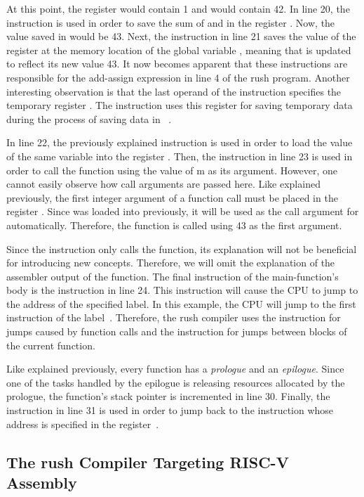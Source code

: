 At this point, the register  would contain 1 and  would contain 42.
In line 20, the  instruction is used in order to save the sum of  and  in the register .
Now, the value saved in  would be 43.
Next, the  instruction in line 21 saves the value of the register  at the memory location of the global variable , meaning that  is updated to reflect its new value 43.
It now becomes apparent that these instructions are responsible for the add-assign expression in line 4 of the rush program.
Another interesting observation is that the last operand of the  instruction specifies the temporary register .
The instruction uses this register for saving temporary data during the process of saving data in ~\cite[reference]{Patterson2017}.

In line 22, the previously explained  instruction is used in order to load the value of the same variable into the register .
Then, the  instruction in line 23 is used in order to call the  function using the value of m as its argument.
However, one cannot easily observe how call arguments are passed here.
Like explained previously, the first integer argument of a function call must be placed in the register .
Since  was loaded into  previously, it will be used as the call argument for  automatically.
Therefore, the  function is called using 43 as the first argument.

Since the  instruction only calls the  function, its explanation will not be beneficial for introducing new concepts.
Therefore, we will omit the explanation of the assembler output of the  function.
The final instruction of the main-function's body is the  instruction in line 24.
This instruction will cause the CPU to jump to the address of the specified label.
In this example, the CPU will jump to the first instruction of the  label~\cite[p.~17]{Patterson2017}.
Therefore, the rush compiler uses the  instruction for jumps caused by function calls and the  instruction for jumps between blocks of the current function.

Like explained previously, every function has a \emph{prologue} and an \emph{epilogue}.
Since one of the tasks handled by the epilogue is releasing resources allocated by the prologue, the function's stack pointer is incremented in line 30.
Finally, the  instruction in line 31 is used in order to jump back to the instruction whose address is specified in the  register~\cite[reference]{Patterson2017}.

\subsection{The rush Compiler Targeting RISC-V Assembly}
